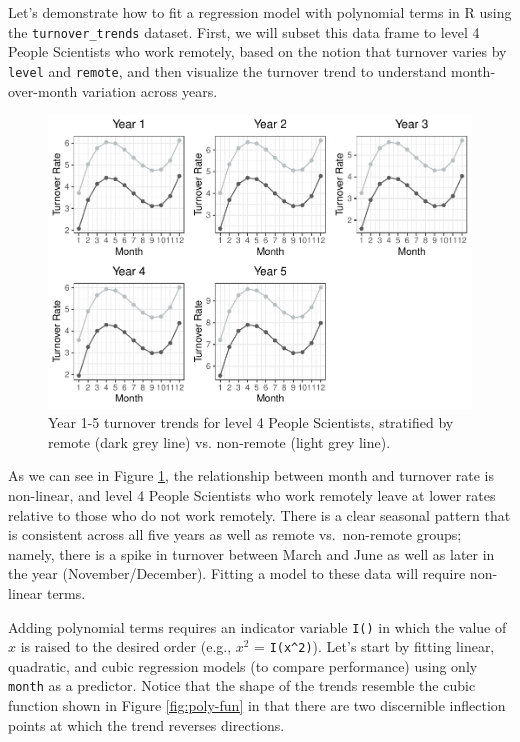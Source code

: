 \documentclass[
]{book}
\begin{document}
Let's demonstrate how to fit a regression model with polynomial terms in R using the \texttt{turnover\_trends} dataset. First, we will subset this data frame to level 4 People Scientists who work remotely, based on the notion that turnover varies by \texttt{level} and \texttt{remote}, and then visualize the turnover trend to understand month-over-month variation across years.

\begin{figure}

{\centering \includegraphics[width=1\linewidth]{People_Analytics_Lifecycle_files/figure-latex/ps-turnover-trends-1} 

}

\caption{Year 1-5 turnover trends for level 4 People Scientists, stratified by remote (dark grey line) vs. non-remote (light grey line).}\label{fig:ps-turnover-trends}
\end{figure}

As we can see in Figure \ref{fig:ps-turnover-trends}, the relationship between month and turnover rate is non-linear, and level 4 People Scientists who work remotely leave at lower rates relative to those who do not work remotely. There is a clear seasonal pattern that is consistent across all five years as well as remote vs.~non-remote groups; namely, there is a spike in turnover between March and June as well as later in the year (November/December). Fitting a model to these data will require non-linear terms.

Adding polynomial terms requires an indicator variable \texttt{I()} in which the value of \(x\) is raised to the desired order (e.g., \(x^2\) = \texttt{I(x\^{}2)}). Let's start by fitting linear, quadratic, and cubic regression models (to compare performance) using only \texttt{month} as a predictor. Notice that the shape of the trends resemble the cubic function shown in Figure \ref{fig:poly-fun} in that there are two discernible inflection points at which the trend reverses directions.
\end{document}
